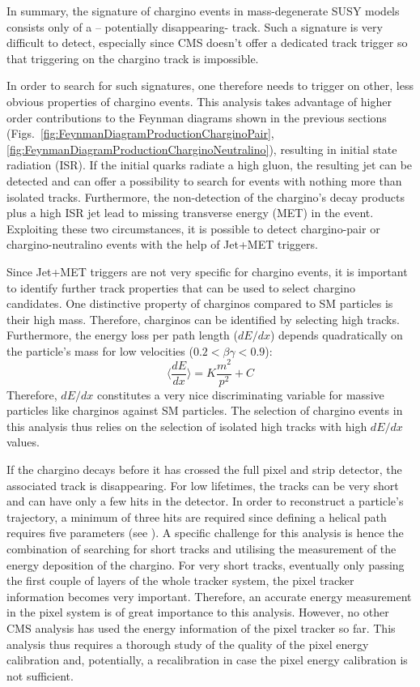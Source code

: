 In summary, the signature of chargino events in mass-degenerate SUSY models consists only of a – potentially disappearing- track. 
Such a signature is very difficult to detect, especially since CMS doesn't offer a dedicated track trigger so that triggering on the chargino track is impossible.

In order to search for such signatures, one therefore needs to trigger on other, less obvious properties of chargino events. 
This analysis takes advantage of higher order contributions to the Feynman diagrams shown in the previous sections (Figs.~\ref{fig:FeynmanDiagramProductionCharginoPair}, \ref{fig:FeynmanDiagramProductionCharginoNeutralino}), resulting in initial state radiation (ISR).
If the initial quarks radiate a high \pt gluon, the resulting jet can be detected and can offer a possibility to search for events with nothing more than isolated tracks.
Furthermore, the non-detection of the chargino's decay products plus a high \pt ISR jet lead to missing transverse energy (MET) in the event. 
Exploiting these two circumstances, it is possible to detect chargino-pair or chargino-neutralino events with the help of Jet+MET triggers.

Since Jet+MET triggers are not very specific for chargino events, it is important to identify further track properties that can be used to select chargino candidates.
One distinctive property of charginos compared to SM particles is their high mass. 
Therefore, charginos can be identified by selecting high \pt tracks. 
Furthermore, the energy loss per path length ($dE/dx$) depends quadratically on the particle's mass for low velocities ($0.2<\beta\gamma<0.9$):
\begin{equation*}
\langle\frac{dE}{dx}\rangle = K \frac{m^2}{p^2} +C
\end{equation*}
Therefore, $dE/dx$ constitutes a very nice discriminating variable for massive particles like charginos against SM particles.
The selection of chargino events in this analysis thus relies on the selection of isolated high \pt tracks with high $dE/dx$ values. 

If the chargino decays before it has crossed the full pixel and strip detector, the associated track is disappearing. 
For low lifetimes, the tracks can be very short and can have only a few hits in the detector. 
In order to reconstruct a particle's trajectory, a minimum of three hits are required since defining a helical path requires five parameters (see \cite{bib:CMS:tracking_8TeV}). 
A specific challenge for this analysis is hence the combination of searching for short tracks and utilising the measurement of the energy deposition of the chargino. 
For very short tracks, eventually only passing the first couple of layers of the whole tracker system, the pixel tracker information becomes very important. 
Therefore, an accurate energy measurement in the pixel system is of great importance to this analysis. 
However, no other CMS analysis has used the energy information of the pixel tracker so far.
This analysis thus requires a thorough study of the quality of the pixel energy calibration and, potentially, a recalibration in case the pixel energy calibration is not sufficient.



